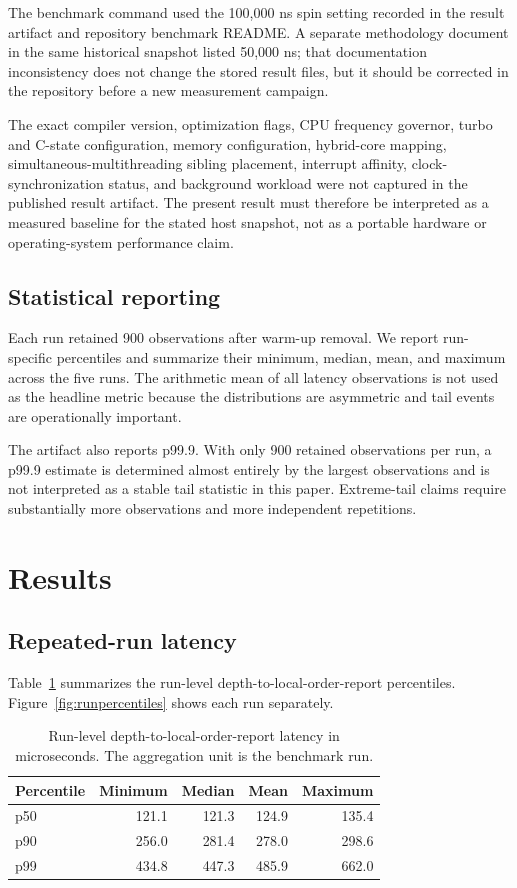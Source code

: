 \documentclass[11pt]{article}
\begin{document}
The benchmark command used the 100,000 ns spin setting recorded in the result artifact and repository benchmark README. A separate methodology document in the same historical snapshot listed 50,000 ns; that documentation inconsistency does not change the stored result files, but it should be corrected in the repository before a new measurement campaign.

The exact compiler version, optimization flags, CPU frequency governor, turbo and C-state configuration, memory configuration, hybrid-core mapping, simultaneous-multithreading sibling placement, interrupt affinity, clock-synchronization status, and background workload were not captured in the published result artifact. The present result must therefore be interpreted as a measured baseline for the stated host snapshot, not as a portable hardware or operating-system performance claim.

\subsection{Statistical reporting}

Each run retained 900 observations after warm-up removal. We report run-specific percentiles and summarize their minimum, median, mean, and maximum across the five runs. The arithmetic mean of all latency observations is not used as the headline metric because the distributions are asymmetric and tail events are operationally important.

The artifact also reports p99.9. With only 900 retained observations per run, a p99.9 estimate is determined almost entirely by the largest observations and is not interpreted as a stable tail statistic in this paper. Extreme-tail claims require substantially more observations and more independent repetitions.

\section{Results}

\subsection{Repeated-run latency}

Table~\ref{tab:results} summarizes the run-level depth-to-local-order-report percentiles. Figure~\ref{fig:runpercentiles} shows each run separately.

\begin{table}[ht]
\centering
\caption{Run-level depth-to-local-order-report latency in microseconds. The aggregation unit is the benchmark run.}
\label{tab:results}
\small
\begin{tabular}{@{}lrrrr@{}}
\toprule
Percentile & Minimum & Median & Mean & Maximum \\
\midrule
p50 & 121.1 & 121.3 & 124.9 & 135.4 \\
p90 & 256.0 & 281.4 & 278.0 & 298.6 \\
p99 & 434.8 & 447.3 & 485.9 & 662.0 \\
\bottomrule
\end{tabular}
\end{table}
\end{document}
